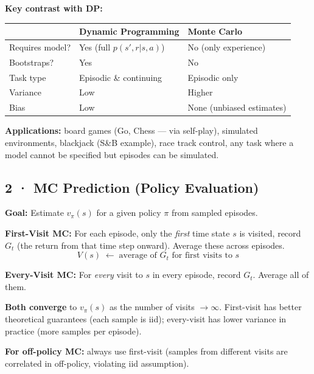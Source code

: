 \documentclass[11pt,a4paper]{article}
\begin{document}
\textbf{Key contrast with DP:}
\begin{center}\small
\begin{tabular}{p{3.5cm}p{5cm}p{5cm}}
\toprule
& \textbf{Dynamic Programming} & \textbf{Monte Carlo} \\
\midrule
Requires model? & Yes (full $p(s',r|s,a)$) & No (only experience) \\
Bootstraps? & Yes & No \\
Task type & Episodic \& continuing & Episodic only \\
Variance & Low & Higher \\
Bias & Low & None (unbiased estimates) \\
\bottomrule
\end{tabular}
\end{center}

\textbf{Applications:} board games (Go, Chess — via self-play), simulated environments, blackjack
(S\&B example), race track control, any task where a model cannot be specified but episodes can
be simulated.

\subsection*{2 · MC Prediction (Policy Evaluation)}

\textbf{Goal:} Estimate $v_\pi(s)$ for a given policy $\pi$ from sampled episodes.

\begin{tcolorbox}[bold={First-Visit vs Every-Visit MC}]
\textbf{First-Visit MC:} For each episode, only the \emph{first} time state $s$ is visited,
record $G_t$ (the return from that time step onward). Average these across episodes.
\[
  V(s) \;\leftarrow\; \text{average of } G_t \text{ for first visits to } s
\]

\textbf{Every-Visit MC:} For \emph{every} visit to $s$ in every episode, record $G_t$.
Average all of them.

\medskip
\textbf{Both converge} to $v_\pi(s)$ as the number of visits $\to \infty$.
First-visit has better theoretical guarantees (each sample is iid); every-visit has lower variance
in practice (more samples per episode).

\medskip
\textbf{For off-policy MC:} always use first-visit (samples from different visits are
correlated in off-policy, violating iid assumption).
\end{tcolorbox}
\end{document}
